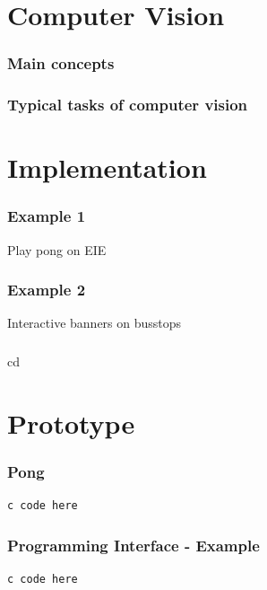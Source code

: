 \documentclass{beamer}
\begin{document}
\section{Computer Vision}

\begin{frame}
\frametitle{Main concepts}
\end{frame}
\begin{frame}
\frametitle{Typical tasks of computer vision}

\end{frame}
\section{Implementation}
\begin{frame}
\frametitle{Example 1}
Play pong on EIE
\end{frame}
\begin{frame}
\frametitle{Example 2}
Interactive banners on busstops
\end{frame}
\begin{frame}
\frametitle{}
\end{frame}
\begin{frame}
\frametitle{}
\end{frame}cd 
\begin{frame}
\frametitle{}
\end{frame}
\section{Prototype}
\begin{frame}[fragile]
\frametitle{Pong}
\begin{lstlisting}
c code here
\end{lstlisting}
\end{frame}
\begin{frame}[fragile]
\frametitle{Programming Interface - Example}
\begin{lstlisting}
c code here
\end{lstlisting}
\end{frame}
\end{document}
